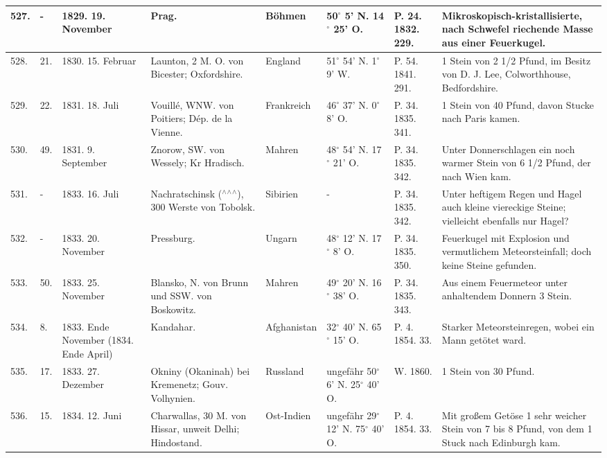 \documentclass[a4paper, 11pt, oneside, polutonikogreek, german]{article}
\begin{document}
\begin{table}[!ht]
\begin{tabular}{|l|l|l|l|l|l|l|l|}
        527. & - & 1829. 19. November & Prag. & Böhmen & 50$^\circ$ 5' N. 14$^\circ$ 25' O. & P. 24. 1832. 229. & Mikroskopisch-kristallisierte, nach Schwefel riechende Masse aus einer Feuerkugel. \\ \hline
        528. & 21. & 1830. 15. Februar & Launton, 2 M. O. von Bicester; Oxfordshire. & England & 51$^\circ$ 54' N. 1$^\circ$ 9' W. & P. 54. 1841. 291. & 1 Stein von 2 1/2 Pfund, im Besitz von D. J. Lee, Colworthhouse, Bedfordshire. \\ \hline
        529. & 22. & 1831. 18. Juli & Vouillé, WNW. von Poitiers; Dép. de la Vienne. & Frankreich & 46$^\circ$ 37' N. 0$^\circ$ 8' O. & P. 34. 1835. 341. & 1 Stein von 40 Pfund, davon Stucke nach Paris kamen. \\ \hline
        530. & 49. & 1831. 9. September & Znorow, SW. von Wessely; Kr Hradisch. & Mahren & 48$^\circ$ 54' N. 17$^\circ$ 21' O. & P. 34. 1835. 342. & Unter Donnerschlagen ein noch warmer Stein von 6 1/2 Pfund, der nach Wien kam. \\ \hline
        531. & - & 1833. 16. Juli & Nachratschinsk ($^\wedge$$^\wedge$$^\wedge$), 300 Werste von Tobolsk. & Sibirien & - & P. 34. 1835. 342. & Unter heftigem Regen und Hagel auch kleine viereckige Steine; vielleicht ebenfalls nur Hagel? \\ \hline
        532. & - & 1833. 20. November & Pressburg. & Ungarn & 48$^\circ$ 12' N. 17$^\circ$ 8' O. & P. 34. 1835. 350. & Feuerkugel mit Explosion und vermutlichem Meteorsteinfall; doch keine Steine gefunden. \\ \hline
        533. & 50. & 1833. 25. November & Blansko, N. von Brunn und SSW. von Boskowitz. & Mahren & 49$^\circ$ 20' N. 16$^\circ$ 38' O. & P. 34. 1835. 343. & Aus einem Feuermeteor unter anhaltendem Donnern 3 Stein. \\ \hline
        534. & 8. & 1833. Ende November (1834. Ende April) & Kandahar. & Afghanistan & 32$^\circ$ 40' N. 65$^\circ$ 15' O. & P. 4. 1854. 33. & Starker Meteorsteinregen, wobei ein Mann getötet ward. \\ \hline
        535. & 17. & 1833. 27. Dezember & Okniny (Okaninah) bei Kremenetz; Gouv. Volhynien. & Russland & ungefähr 50$^\circ$ 6' N. 25$^\circ$ 40' O. & W. 1860. & 1 Stein von 30 Pfund. \\ \hline
        536. & 15. & 1834. 12. Juni & Charwallas, 30 M. von Hissar, unweit Delhi; Hindostand. & Ost-Indien & ungefähr 29$^\circ$ 12' N. 75$^\circ$ 40' O. & P. 4. 1854. 33. & Mit großem Getöse 1 sehr weicher Stein von 7 bis 8 Pfund, von dem 1 Stuck nach Edinburgh kam. \\ \hline

\end{tabular}
\end{table}
\end{document}
